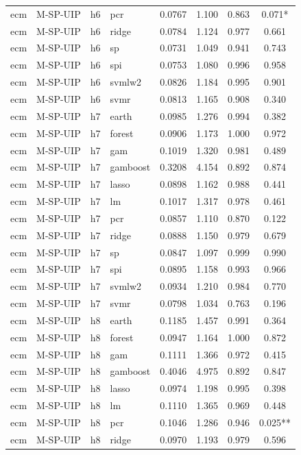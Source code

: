 \begin{ThreePartTable}
\begin{longtable}[t]{llclcccc}
ecm & M-SP-UIP & h6 & pcr & 0.0767 & 1.100 & 0.863 & 0.071*\\
ecm & M-SP-UIP & h6 & ridge & 0.0784 & 1.124 & 0.977 & 0.661\\
ecm & M-SP-UIP & h6 & sp & 0.0731 & 1.049 & 0.941 & 0.743\\
ecm & M-SP-UIP & h6 & spi & 0.0753 & 1.080 & 0.996 & 0.958\\
ecm & M-SP-UIP & h6 & svmlw2 & 0.0826 & 1.184 & 0.995 & 0.901\\
ecm & M-SP-UIP & h6 & svmr & 0.0813 & 1.165 & 0.908 & 0.340\\
\addlinespace
ecm & M-SP-UIP & h7 & earth & 0.0985 & 1.276 & 0.994 & 0.382\\
ecm & M-SP-UIP & h7 & forest & 0.0906 & 1.173 & 1.000 & 0.972\\
ecm & M-SP-UIP & h7 & gam & 0.1019 & 1.320 & 0.981 & 0.489\\
ecm & M-SP-UIP & h7 & gamboost & 0.3208 & 4.154 & 0.892 & 0.874\\
ecm & M-SP-UIP & h7 & lasso & 0.0898 & 1.162 & 0.988 & 0.441\\
ecm & M-SP-UIP & h7 & lm & 0.1017 & 1.317 & 0.978 & 0.461\\
ecm & M-SP-UIP & h7 & pcr & 0.0857 & 1.110 & 0.870 & 0.122\\
ecm & M-SP-UIP & h7 & ridge & 0.0888 & 1.150 & 0.979 & 0.679\\
ecm & M-SP-UIP & h7 & sp & 0.0847 & 1.097 & 0.999 & 0.990\\
ecm & M-SP-UIP & h7 & spi & 0.0895 & 1.158 & 0.993 & 0.966\\
ecm & M-SP-UIP & h7 & svmlw2 & 0.0934 & 1.210 & 0.984 & 0.770\\
ecm & M-SP-UIP & h7 & svmr & 0.0798 & 1.034 & 0.763 & 0.196\\
\addlinespace
ecm & M-SP-UIP & h8 & earth & 0.1185 & 1.457 & 0.991 & 0.364\\
ecm & M-SP-UIP & h8 & forest & 0.0947 & 1.164 & 1.000 & 0.872\\
ecm & M-SP-UIP & h8 & gam & 0.1111 & 1.366 & 0.972 & 0.415\\
ecm & M-SP-UIP & h8 & gamboost & 0.4046 & 4.975 & 0.892 & 0.847\\
ecm & M-SP-UIP & h8 & lasso & 0.0974 & 1.198 & 0.995 & 0.398\\
ecm & M-SP-UIP & h8 & lm & 0.1110 & 1.365 & 0.969 & 0.448\\
ecm & M-SP-UIP & h8 & pcr & 0.1046 & 1.286 & 0.946 & 0.025**\\
ecm & M-SP-UIP & h8 & ridge & 0.0970 & 1.193 & 0.979 & 0.596\\

\end{longtable}
\end{ThreePartTable}
